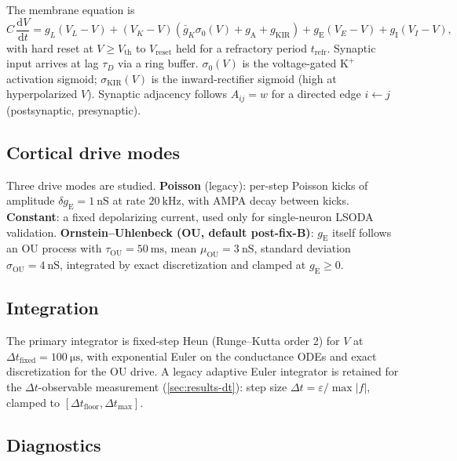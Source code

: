 \documentclass[11pt]{article}
\newcommand{\dt}{\Delta t}
\newcommand{\Vth}{V_{\text{th}}}
\newcommand{\gA}{g_{\text{A}}}
\newcommand{\gE}{g_{\text{E}}}
\newcommand{\gI}{g_{\text{I}}}
\newcommand{\gKIR}{g_{\text{KIR}}}
\begin{document}
The membrane equation is
\begin{equation}
\label{eq:membrane}
C\,\frac{\mathrm{d}V}{\mathrm{d}t}
  = g_L (V_L - V)
  + (V_K - V)\!\left(\bar{g}_K \sigma_0(V) + \gA + \gKIR\right)
  + \gE(V_E - V)
  + \gI(V_I - V),
\end{equation}
with hard reset at $V \ge \Vth$ to $V_{\text{reset}}$ held for a
refractory period $t_{\text{refr}}$. Synaptic input arrives at lag
$\tau_D$ via a ring buffer.
$\sigma_0(V)$ is the voltage-gated $\text{K}^+$ activation
sigmoid; $\sigma_{\text{KIR}}(V)$ is the inward-rectifier sigmoid
(high at hyperpolarized $V$). Synaptic adjacency follows
$A_{ij} = w$ for a directed edge $i \leftarrow j$ (postsynaptic,
presynaptic).

\subsection{Cortical drive modes}
\label{sec:methods-drive}

Three drive modes are studied. \textbf{Poisson} (legacy): per-step
Poisson kicks of amplitude $\delta\gE = \SI{1}{\nano\siemens}$ at
rate $\SI{20}{\kilo\hertz}$, with AMPA decay between kicks.
\textbf{Constant}: a fixed depolarizing current, used only for
single-neuron LSODA validation. \textbf{Ornstein--Uhlenbeck (OU,
default post-fix-B)}: $\gE$ itself follows an OU process with
$\tau_{\text{OU}} = \SI{50}{\milli\second}$, mean
$\mu_{\text{OU}} = \SI{3}{\nano\siemens}$, standard deviation
$\sigma_{\text{OU}} = \SI{4}{\nano\siemens}$, integrated by exact
discretization and clamped at $\gE \ge 0$.

\subsection{Integration}
\label{sec:methods-integrators}

The primary integrator is fixed-step Heun (Runge--Kutta order 2) for
$V$ at $\dt_{\text{fixed}} = \SI{100}{\micro\second}$, with
exponential Euler on the conductance ODEs and exact discretization
for the OU drive. A legacy adaptive Euler integrator is retained for
the $\dt$-observable measurement
(\cref{sec:results-dt}): step size $\dt = \varepsilon/\max|f|$,
clamped to $[\dt_{\text{floor}}, \dt_{\text{max}}]$.

\subsection{Diagnostics}
\label{sec:methods-diagnostics}
\end{document}

